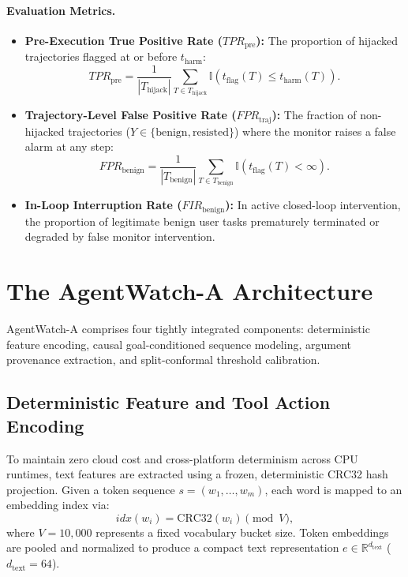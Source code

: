 \documentclass[11pt,a4paper]{article}
\begin{document}
\paragraph{Evaluation Metrics.}
\begin{itemize}
    \item \textbf{Pre-Execution True Positive Rate ($TPR_{\text{pre}}$):} The proportion of hijacked trajectories flagged at or before $t_{\text{harm}}$:
    \begin{equation}
        TPR_{\text{pre}} = \frac{1}{|T_{\text{hijack}}|} \sum_{T \in T_{\text{hijack}}} \mathbb{I}(t_{\text{flag}}(T) \le t_{\text{harm}}(T)).
    \end{equation}
    \item \textbf{Trajectory-Level False Positive Rate ($FPR_{\text{traj}}$):} The fraction of non-hijacked trajectories ($Y \in \{\text{benign}, \text{resisted}\}$) where the monitor raises a false alarm at any step:
    \begin{equation}
        FPR_{\text{benign}} = \frac{1}{|T_{\text{benign}}|} \sum_{T \in T_{\text{benign}}} \mathbb{I}(t_{\text{flag}}(T) < \infty).
    \end{equation}
    \item \textbf{In-Loop Interruption Rate ($FIR_{\text{benign}}$):} In active closed-loop intervention, the proportion of legitimate benign user tasks prematurely terminated or degraded by false monitor intervention.
\end{itemize}

\section{The AgentWatch-A Architecture}
\label{sec:method}

AgentWatch-A comprises four tightly integrated components: deterministic feature encoding, causal goal-conditioned sequence modeling, argument provenance extraction, and split-conformal threshold calibration.

\subsection{Deterministic Feature and Tool Action Encoding}
To maintain zero cloud cost and cross-platform determinism across CPU runtimes, text features are extracted using a frozen, deterministic CRC32 hash projection. Given a token sequence $s = (w_1, \dots, w_m)$, each word is mapped to an embedding index via:
\begin{equation}
    idx(w_i) = \text{CRC32}(w_i) \pmod V,
\end{equation}
where $V = 10{,}000$ represents a fixed vocabulary bucket size. Token embeddings are pooled and normalized to produce a compact text representation $e \in \mathbb{R}^{d_{\text{text}}}$ ($d_{\text{text}} = 64$).
\end{document}
